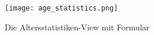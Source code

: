 \begin{figure}
\centering
\texttt{[image: age\_statistics.png]}
\caption{Die Altersstatistiken-View mit Formular}
\label{fig:die_altersstatistiken_view_mit_formular}
\end{figure}






